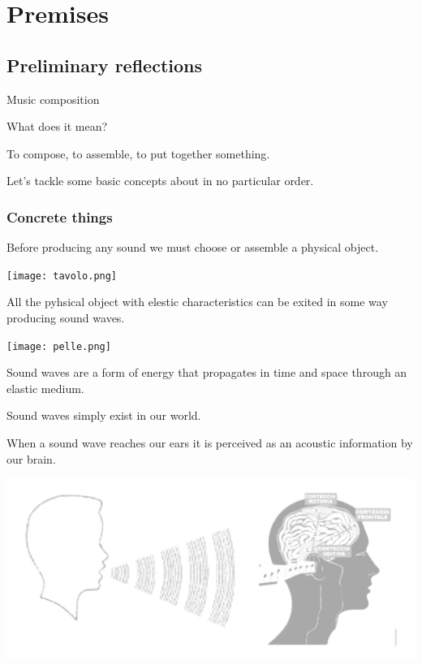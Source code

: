 \chapter{Premises}

\section{Preliminary reflections}\label{preliminary-reflections}

Music composition

What does it mean?

To compose, to assemble, to put together something.

Let's tackle some basic concepts about in no particular order.

\subsection{Concrete things}\label{concrete-things}

Before producing any sound we must choose or assemble a physical object.

\begin{center}
\texttt{[image: tavolo.png]}
\end{center}

All the pyhsical object with elestic characteristics can be exited in some way producing sound waves.

\begin{center}
\texttt{[image: pelle.png]}
\end{center}

Sound waves are a form of energy that propagates in time and space through an elastic medium.

Sound waves simply exist in our world.

When a sound wave reaches our ears it is perceived as an acoustic information by our brain.

\begin{center}
\includegraphics[scale=0.5]{../img/percezione.png}
\end{center}

